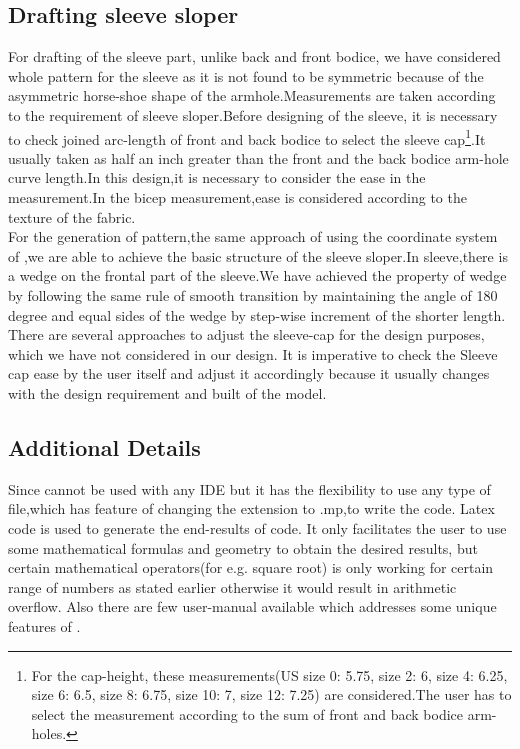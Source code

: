 \documentclass[10pt,letterpaper]{ltugboat}
\begin{document}
\subsection{Drafting sleeve sloper}
For drafting of the sleeve part, unlike back and front bodice, we have considered whole pattern for the sleeve as it is not found to be symmetric because of the asymmetric horse-shoe shape of the armhole.Measurements are taken according to the requirement of sleeve sloper.Before designing of the sleeve, it is necessary to check joined arc-length of front and back bodice to select the sleeve cap\footnote{For the cap-height, these measurements(US size 0: 5.75, size 2: 6, size 4: 6.25, size 6: 6.5, size 8: 6.75, size 10: 7, size 12: 7.25) are considered.The user has to select the measurement according to the sum of front and back bodice arm-holes.}.It usually taken as half an inch greater than the front and the back bodice arm-hole curve length.In this design,it is necessary to consider the ease in the measurement.In the bicep measurement,ease is considered according to the texture of the fabric.
\\For the generation of pattern,the same approach of using the coordinate system of \MP{},we are able to achieve the basic structure of the sleeve sloper.In sleeve,there is a wedge on the frontal part of the sleeve.We have achieved the property of wedge by following the same rule of smooth transition by maintaining the angle of 180 degree and equal sides of the wedge by step-wise increment of the shorter length.
\\There are several approaches to adjust the sleeve-cap for the design purposes, which we have not considered in our design. It is imperative to check the Sleeve cap ease by the user itself and adjust it accordingly because it usually changes with the design requirement and built of the model\cite{maddie}.

\subsection{Additional Details}
Since \MP{} cannot be used with any IDE but it has the flexibility to use any type of file,which has feature of changing the extension to .mp,to write the code. Latex code is used to generate the end-results of \MP{} code. It only facilitates the user to use some mathematical formulas and geometry to obtain the desired results, but certain mathematical operators(for e.g. square root) is only working for certain range of numbers as stated earlier otherwise it would result in arithmetic overflow. Also there are few user-manual available which addresses some unique features of \MP{}.
\end{document}

